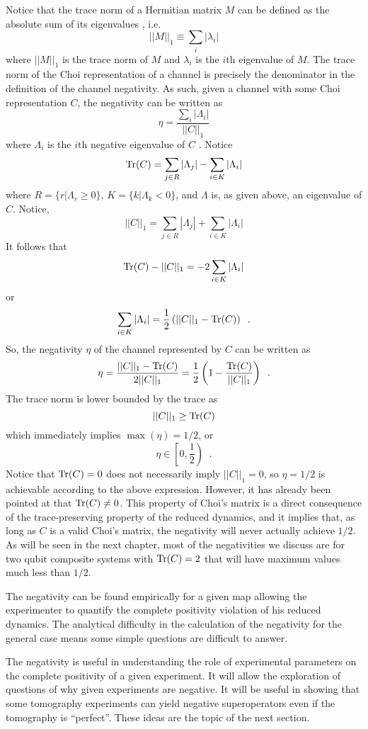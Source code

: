 Notice that the trace norm of a Hermitian matrix $M$ can be defined as the absolute sum of its eigenvalues \cite{Wilde2013}, i.e.\
$$
||M||_1 \equiv \sum_i |\lambda_i|
$$
where $||M||_1$ is the trace norm of $M$ and $\lambda_i$ is the $i$th eigenvalue of $M$.  The trace norm of the Choi representation of a channel is precisely the denominator in the definition of the channel negativity.  As such, given a channel with some Choi representation $C$, the negativity can be written as
$$
\eta = \frac{\sum_i |\Lambda_i|}{||C||_1}
$$
where $\Lambda_i$ is the $i$th negative eigenvalue of $C$ .  Notice
$$
\operatorname{Tr}(C) = \sum_{j\in R} |\Lambda_j| - \sum_{i\in K} |\Lambda_i|
$$
where $R = \{r|\Lambda_r\ge 0\}$, $K = \{k|\Lambda_k < 0\}$, and $\Lambda$ is, as given above, an eigenvalue of $C$.  Notice,
$$
||C||_1 = \sum_{j\in R} |\Lambda_j| + \sum_{i\in K} |\Lambda_i|
$$
It follows that
$$
\operatorname{Tr}(C) - ||C||_1 = -2\sum_{i\in K} |\Lambda_i|
$$
or
$$
\sum_{i\in K} |\Lambda_i| = \frac{1}{2}\left(||C||_1 - \operatorname{Tr}(C)\right)\;\;.
$$  
So, the negativity $\eta$ of the channel represented by $C$ can be written as
$$
\eta = \frac{||C||_1-\operatorname{Tr}(C)}{2||C||_1} = \frac{1}{2}\left(1-\frac{\operatorname{Tr}(C)}{||C||_1}\right)\;\;.
$$
The trace norm is lower bounded by the trace as
$$
||C||_1 \ge \operatorname{Tr}(C)
$$
which immediately implies $\max(\eta) = 1/2$, or 
$$
\eta\in\left[0,\frac{1}{2}\right)\;\;.
$$
Notice that $\operatorname{Tr}(C)=0$ does not necessarily imply $||C||_1=0$, so $\eta=1/2$ is achievable according to the above expression.  However, it has already been pointed at that $\operatorname{Tr}(C)\neq 0$.  This property of Choi's matrix is a direct consequence of the trace-preserving property of the reduced dynamics, and it implies that, as long as $C$ is a valid Choi's matrix, the negativity will never actually achieve $1/2$.  As will be seen in the next chapter, most of the negativities we discuss are for two qubit composite systems with $\operatorname{Tr}(C)=2$ that will have maximum values much less than $1/2$.

The negativity can be found empirically for a given map allowing the experimenter to quantify the complete positivity violation of his reduced dynamics.  The analytical difficulty in the calculation of the negativity for the general case means some simple questions are difficult to answer.

The negativity is useful in understanding the role of experimental parameters on the complete positivity of a given experiment.  It will allow the exploration of questions of why given experiments are negative.  It will be useful in showing that some tomography experiments can yield negative superoperators even if the tomography is ``perfect''.  These ideas are the topic of the next section.



